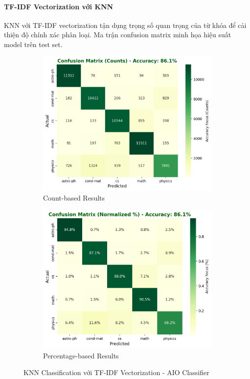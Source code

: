 \paragraph{TF-IDF Vectorization với KNN}

KNN với TF-IDF vectorization tận dụng trọng số quan trọng của từ khóa để cải thiện độ chính xác phân loại. Ma trận confusion matrix minh họa hiệu suất model trên test set.

\begin{figure}[H]
\centering
\begin{subfigure}{0.48\textwidth}
    \centering
    \includegraphics[width=\textwidth]{image/Knn + TfIDF count.png}
    \caption{Count-based Results}
    \label{fig:knn_tfidf_count_improvements}
\end{subfigure}
\hfill
\begin{subfigure}{0.48\textwidth}
    \centering
    \includegraphics[width=\textwidth]{image/Knn + Tfidf PrCent.png}
    \caption{Percentage-based Results}
    \label{fig:knn_tfidf_percent_improvements}
\end{subfigure}
\caption{KNN Classification với TF-IDF Vectorization - AIO Classifier}
\label{fig:knn_tfidf_results_improvements}
\end{figure}

